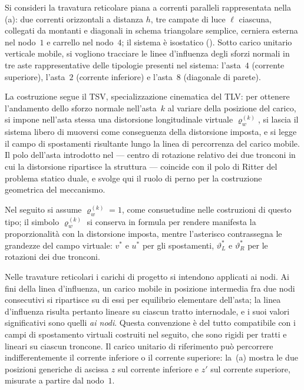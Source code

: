 \begin{esempio}
	\label{subsec:LI_reticolare}
	
	Si consideri la travatura reticolare piana a correnti paralleli
	rappresentata nella \,(a):
	due correnti orizzontali a distanza $h$, tre campate di luce $\ell$
	ciascuna, collegati da montanti e diagonali in schema triangolare
	semplice, cerniera esterna nel nodo~$1$ e carrello nel nodo~$4$;
	il sistema è isostatico ().
	Sotto carico unitario verticale mobile, si vogliono tracciare le
	linee d'influenza degli sforzi normali in tre aste rappresentative
	delle tipologie presenti nel sistema: l'asta~$4$ (corrente
	superiore), l'asta~$2$ (corrente inferiore) e l'asta~$8$ (diagonale
	di parete).
	
	\begin{svolgimento}
		
		La costruzione segue il TSV, specializzazione cinematica del TLV:
		per ottenere l'andamento dello sforzo normale nell'asta~$k$ al
		variare della posizione del carico, si impone nell'asta stessa una
		distorsione longitudinale virtuale $\varrho_w^{(k)}$, si lascia il
		sistema libero di muoversi come conseguenza della distorsione
		imposta, e si legge il campo di spostamenti risultante lungo la
		linea di percorrenza del carico mobile. Il polo dell'asta introdotto
		nel  --- centro di rotazione relativo dei
		due tronconi in cui la distorsione ripartisce la struttura ---
		coincide con il polo di Ritter del problema statico duale, e svolge
		qui il ruolo di perno per la costruzione geometrica del meccanismo.
		
		Nel seguito si assume $\varrho_w^{(k)}=1$, come consuetudine nelle
		costruzioni di questo tipo; il simbolo $\varrho_w^{(k)}$ si
		conserva in formula per rendere manifesta la proporzionalità con la
		distorsione imposta, mentre l'asterisco contrassegna le grandezze
		del campo virtuale: $v^*$ e $u^*$ per gli spostamenti, $\vartheta_L^*$
		e $\vartheta_R^*$ per le rotazioni dei due tronconi.
		
		
		Nelle travature reticolari i carichi di progetto si intendono
		applicati ai nodi. Ai fini della linea d'influenza, un carico
		mobile in posizione intermedia fra due nodi consecutivi si ripartisce
		su di essi per equilibrio elementare dell'asta; la linea d'influenza
		risulta pertanto lineare su ciascun tratto internodale, e i suoi
		valori significativi sono quelli \emph{ai nodi}. Questa convenzione
		è del tutto compatibile con i campi di spostamento virtuali costruiti
		nel seguito, che sono rigidi per tratti e lineari su ciascun troncone.
		Il carico unitario di riferimento può percorrere indifferentemente
		il corrente inferiore o il corrente superiore: la
		\,(a) mostra le due posizioni generiche
		di ascissa $z$ sul corrente inferiore e $z'$ sul corrente superiore,
		misurate a partire dal nodo~$1$.
		

\end{svolgimento}
\end{esempio}
